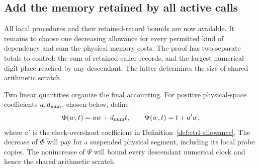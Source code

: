 \documentclass[11pt]{article}
\numberwithin{equation}{section}
\theoremstyle{definition}
\theoremstyle{remark}
\begin{document}
\subsection{Add the memory retained by all active calls}\label{sec:ctrl-space}

All local procedures and their retained-record bounds are now available. It remains to choose one decreasing allowance for every permitted kind of dependency and sum the physical memory costs. The proof has two separate totals to control: the sum of retained caller records, and the largest numerical digit place reached by any descendant. The latter determines the size of shared arithmetic scratch.

Two linear quantities organize the final accounting.  For positive
physical-space coefficients ${a},{d_{\rm num}}$, chosen below, define
\begin{equation}\label{eq:ctrl-potentials}
 \Phi(w,t)={a}w+{d_{\rm num}}t,\qquad \Psi(w,t)=t+a'w,
\end{equation}
where $a'$ is the clock-overshoot coefficient in
Definition~\ref{def:ctrl-allowance}.  The decrease of $\Phi$ will pay for
a suspended physical segment, including its local probe copies.
The nonincrease of $\Psi$ will bound every descendant numerical clock
and hence the shared arithmetic scratch.
\end{document}
